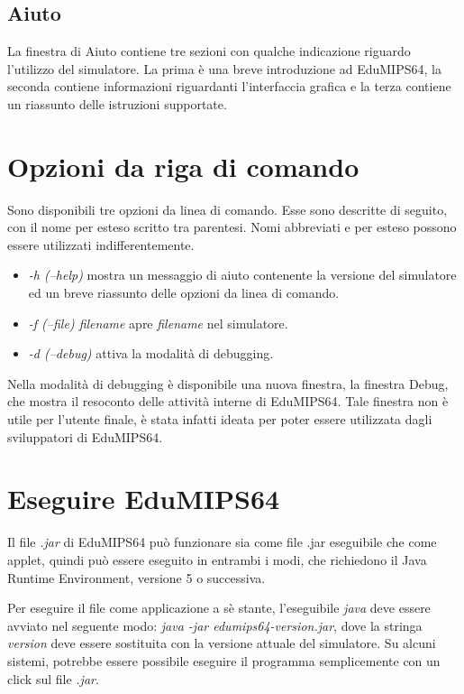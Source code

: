 \documentclass[letterpaper,10pt,italian]{sphinxmanual}
\begin{document}
\subsection{Aiuto}
\label{user-interface:id1}
La finestra di Aiuto contiene tre sezioni con qualche indicazione riguardo
l'utilizzo del simulatore.  La prima è una breve introduzione ad
EduMIPS64, la seconda contiene informazioni riguardanti l'interfaccia grafica
e la terza contiene un riassunto delle istruzioni supportate.


\section{Opzioni da riga di comando}
\label{user-interface:opzioni-da-riga-di-comando}
Sono disponibili tre opzioni da linea di comando. Esse sono descritte di
seguito, con il nome per esteso scritto tra parentesi.  Nomi abbreviati e per
esteso possono essere utilizzati indifferentemente.
\begin{itemize}
\item {} 
\emph{-h (--help)} mostra un messaggio di aiuto contenente la versione del
simulatore ed un breve riassunto delle opzioni da linea di comando.

\item {} 
\emph{-f (--file) filename} apre \emph{filename} nel simulatore.

\item {} 
\emph{-d (--debug)} attiva la modalità di debugging.

\end{itemize}

Nella modalità di debugging è disponibile una nuova finestra, la finestra
Debug, che mostra il resoconto delle attività interne di  EduMIPS64. Tale
finestra non è utile per l'utente finale, è stata infatti ideata per
poter essere utilizzata dagli sviluppatori di EduMIPS64.


\section{Eseguire EduMIPS64}
\label{user-interface:eseguire-edumips64}
Il file \emph{.jar} di EduMIPS64 può funzionare sia come file .jar
eseguibile che come applet, quindi può essere eseguito in entrambi i modi,
che richiedono il Java Runtime Environment, versione 5 o successiva.

Per eseguire il file come applicazione a sè stante, l'eseguibile
\emph{java} deve essere avviato nel seguente modo: \emph{java -jar
edumips64-version.jar}, dove la stringa \emph{version} deve essere
sostituita con la versione attuale del simulatore.  Su alcuni sistemi,
potrebbe essere possibile eseguire il programma semplicemente con un click sul
file \emph{.jar}.
\end{document}
